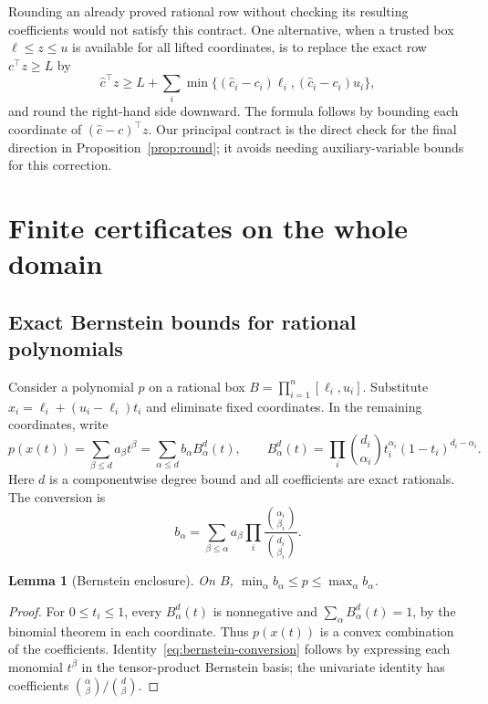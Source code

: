 \documentclass[11pt]{article}
\newtheorem{lemma}[theorem]{Lemma}
\theoremstyle{definition}
\theoremstyle{remark}
\begin{document}
Rounding an already proved rational row without checking its resulting
coefficients would not satisfy this contract. One alternative, when a
trusted box $\ell\le z\le u$ is available for all lifted coordinates,
is to replace the exact row $c^\top z\ge L$ by
\[
\widehat c^\top z\ge
L+\sum_i\min\{(\widehat c_i-c_i)\ell_i,
                 (\widehat c_i-c_i)u_i\},
\]
and round the right-hand side downward. The formula follows by bounding
each coordinate of $(\widehat c-c)^\top z$. Our principal contract is
the direct check for the final direction in
Proposition~\ref{prop:round}; it avoids needing auxiliary-variable bounds
for this correction.

\section{Finite certificates on the whole domain}\label{sec:numerics}

\subsection{Exact Bernstein bounds for rational polynomials}

Consider a polynomial $p$ on a rational box
$B=\prod_{i=1}^n[\ell_i,u_i]$. Substitute
$x_i=\ell_i+(u_i-\ell_i)t_i$ and eliminate fixed coordinates. In the
remaining coordinates, write
\[
p(x(t))=\sum_{\beta\le d}a_\beta t^\beta
       =\sum_{\alpha\le d}b_\alpha B_\alpha^d(t),\qquad
B_\alpha^d(t)=\prod_i
\binom{d_i}{\alpha_i}t_i^{\alpha_i}(1-t_i)^{d_i-\alpha_i}.
\]
Here $d$ is a componentwise degree bound and all coefficients are exact
rationals. The conversion is
\begin{equation}\label{eq:bernstein-conversion}
b_\alpha=\sum_{\beta\le\alpha}a_\beta
\prod_i\frac{\binom{\alpha_i}{\beta_i}}{\binom{d_i}{\beta_i}}.
\end{equation}

\begin{lemma}[Bernstein enclosure]\label{lem:bernstein}
On $B$, $\min_\alpha b_\alpha\le p\le\max_\alpha b_\alpha$.
\end{lemma}
\begin{proof}
For $0\le t_i\le1$, every $B_\alpha^d(t)$ is nonnegative and
$\sum_\alpha B_\alpha^d(t)=1$, by the binomial theorem in each
coordinate. Thus $p(x(t))$ is a convex combination of the coefficients.
Identity~\eqref{eq:bernstein-conversion} follows by expressing each
monomial $t^\beta$ in the tensor-product Bernstein basis; the univariate
identity has coefficients $\binom{\alpha}{\beta}/\binom d\beta$.
\end{proof}
\end{document}
